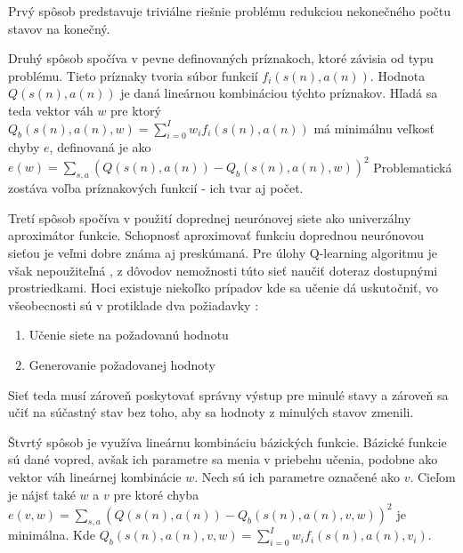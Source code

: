 Prvý spôsob predstavuje triviálne riešnie problému redukciou nekonečného
počtu stavov na konečný.

Druhý spôsob spočíva v pevne definovaných príznakoch, ktoré závisia od typu
problému. Tieto príznaky tvoria súbor funkcií $f_{i}(s(n),a(n))$. Hodnota $Q(s(n), a(n))$
je daná lineárnou kombináciou týchto príznakov. Hľadá sa teda vektor váh
$w$ pre ktorý  $Q_b(s(n), a(n), w) = \sum\limits_{i=0}^{I}w_i f_{i}(s(n),a(n))$
má minimálnu veľkosť chyby $e$, definovaná je ako
$e(w) = \sum\limits_{s,a} (Q(s(n), a(n))- Q_b(s(n), a(n), w))^2$
Problematická zostáva voľba príznakových funkcií - ich tvar aj počet.

Tretí spôsob spočíva v použití doprednej neurónovej siete ako univerzálny aproximátor funkcie.
Schopnosť aproximovať funkciu doprednou neurónovou sieťou je veľmi dobre známa aj preskúmaná.
Pre úlohy Q-learning algoritmu je však nepoužiteľná \cite{bib:q_fnn_problem},
z dôvodov nemožnosti túto sieť naučiť doteraz dostupnými prostriedkami. Hoci existuje niekoľko prípadov kde sa učenie dá
uskutočniť, vo všeobecnosti sú v protiklade dva požiadavky :
\begin{enumerate}
  \item Učenie siete na požadovanú hodnotu
  \item Generovanie požadovanej hodnoty
\end{enumerate}

Sieť teda musí zároveň poskytovať správny výstup pre minulé stavy a zároveň sa
učiť na súčastný stav bez toho, aby sa hodnoty z minulých stavov zmenili.

Štvrtý spôsob je využíva lineárnu kombináciu bázických funkcie.
Bázické funkcie sú dané vopred, avšak ich parametre sa menia v priebehu učenia,
podobne ako vektor váh lineárnej kombinácie $w$. Nech sú ich parametre označené
ako $v$. Cieľom je nájsť také $w$ a $v$ pre ktoré chyba
$e(v, w) = \sum\limits_{s,a}(Q(s(n), a(n))- Q_b(s(n), a(n), v, w))^2$
je minimálna. Kde $Q_b(s(n), a(n), v, w) = \sum\limits_{i=0}^{I}w_i f_{i}(s(n),a(n), v_i)$.

